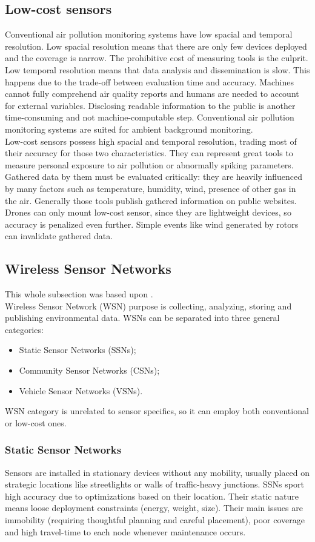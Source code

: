 \documentclass[journal]{IEEEtran}
\begin{document}
\subsection{Low-cost sensors}
Conventional air pollution monitoring systems have low spacial and temporal resolution. Low spacial resolution means that there are only few devices deployed and the coverage is narrow. The prohibitive cost of measuring tools is the culprit. Low temporal resolution means that data analysis and dissemination is slow. This happens due to the trade-off between evaluation time and accuracy. Machines cannot fully comprehend air quality reports and humans are needed to account for external variables. Disclosing readable information to the public is another time-consuming and not machine-computable step. Conventional air pollution monitoring systems are suited for ambient background monitoring. 
\\
Low-cost sensors possess high spacial and temporal resolution, trading most of their accuracy for those two characteristics. They can represent great tools to measure personal exposure to air pollution or abnormally spiking parameters. Gathered data by them must be evaluated critically: they are heavily influenced by many factors such as temperature, humidity, wind, presence of other gas in the air. Generally those tools publish gathered information on public websites. Drones can only mount low-cost sensor, since they are lightweight devices, so accuracy is penalized even further. Simple events like wind generated by rotors can invalidate gathered data.


\subsection{Wireless Sensor Networks}
This whole subsection was based upon \cite{wsnsurvey}.
\\
Wireless Sensor Network (WSN) purpose is collecting, analyzing, storing and publishing environmental data. WSNs can be separated into three general categories:
\begin{itemize}
	\item Static Sensor Networks (SSNs);
    \item Community Sensor Networks (CSNs);
    \item Vehicle Sensor Networks (VSNs).
\end{itemize}
WSN category is unrelated to sensor specifics, so it can employ both conventional or low-cost ones.

\subsubsection{Static Sensor Networks}
Sensors are installed in stationary devices without any mobility, usually placed on strategic locations like streetlights or walls of traffic-heavy junctions. SSNs sport high accuracy due to optimizations based on their location. Their static nature means loose deployment constraints (energy, weight, size). Their main issues are immobility (requiring thoughtful planning and careful placement), poor coverage and high travel-time to each node whenever maintenance occurs.
\end{document}
